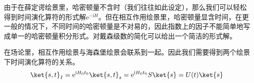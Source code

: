 由于在薛定谔绘景里，哈密顿量不含时（我们往往如此设定），那么我们可以轻松得到时间演化算符的形式解$\mathrm{e}^{-\mathrm{i}H}$。但在相互作用绘景里，哈密顿量显含时间，在更一般的情况下，不同时间的哈密顿量是不对易的，因此指数上的因子不能简单地写成单一的哈密顿量积分形式。对戴森级数的简化可以给出一个简洁的形式解。

在场论里，相互作用绘景与海森堡绘景会联系到一起。因此我们需要得到两个绘景下时间演化算符的关系。
\begin{equation}
\ket{s,t}_I=\mathrm{e} ^{\mathrm{i}H_0t_0}\ket{s,t}_s=\mathrm{e} ^{\mathrm{i}H_0t_0}S\ket{s}=U(t)\ket{s}
\end{equation}





